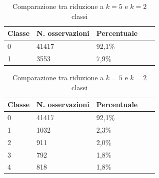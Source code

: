 \begin{table}[h]
    \centering
    \begin{subtable}[t]{.45\linewidth}
        \caption{Riduzione del numero di classi a $k=2$}
        \begin{tabular}[t]{lllll}
            \hline
            Classe & N. osservazioni & Percentuale &  &  \\
            \hline
            0      & 41417                  & 92,1\%                 &  &  \\
            1      & 3553                   & 7,9\%                  &  &  \\
        \end{tabular}
    \end{subtable}
    \quad
    \begin{subtable}[t]{.45\linewidth}
        \caption{Riduzione del numero di classi a $k=5$}
        \begin{tabular}[t]{lllll}
            \hline
            Classe & N. osservazioni & Percentuale &  &  \\
            \hline
            0      & 41417                  & 92,1\%                 &  &  \\
            1      & 1032                   & 2,3\%                  &  &  \\
            2      & 911                    & 2,0\%                  &  &  \\
            3      & 792                    & 1,8\%                  &  &  \\
            4      & 818                    & 1,8\%                  &  & 
        \end{tabular}
    \end{subtable}
    \caption{Comparazione tra riduzione a $k=5$ e $k=2$ classi}
    \label{tab:riduzione}
\end{table}

